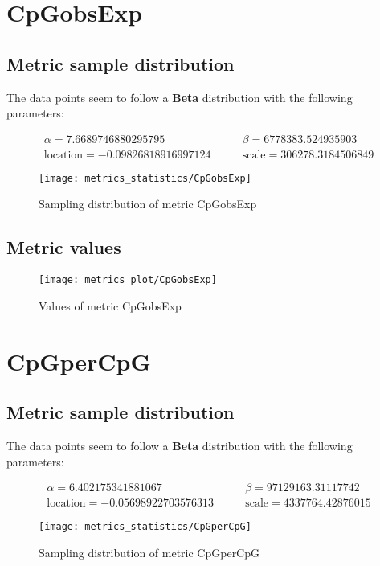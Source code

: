 \documentclass[\main/main.tex]{subfiles}
\begin{document}
\clearpage
\section{CpGobsExp}
\subsection{Metric sample distribution}
The data points seem to follow a \textbf{Beta} distribution with the following parameters:

\begin{align*}
  \alpha   = 7.6689746880295795          & \qquad  \beta = 6778383.524935903       \\
  \text{location} = -0.09826818916997124 & \qquad \text{scale} = 306278.3184506849
\end{align*}

\begin{figure}
  \texttt{[image: metrics\_statistics/CpGobsExp]}
  \caption{Sampling distribution of metric CpGobsExp}
\end{figure}
\subsection{Metric values}
\begin{figure}
  \texttt{[image: metrics\_plot/CpGobsExp]}
  \caption{Values of metric CpGobsExp}
\end{figure}

\clearpage
\section{CpGperCpG}
\subsection{Metric sample distribution}
The data points seem to follow a \textbf{Beta} distribution with the following parameters:

\begin{align*}
  \alpha   = 6.402175341881067           & \qquad  \beta = 97129163.31117742      \\
  \text{location} = -0.05698922703576313 & \qquad \text{scale} = 4337764.42876015
\end{align*}
\begin{figure}
  \texttt{[image: metrics\_statistics/CpGperCpG]}
  \caption{Sampling distribution of metric CpGperCpG}
\end{figure}
\end{document}
